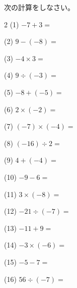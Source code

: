 \documentclass[a4paper, 11pt]{ltjsarticle}
\begin{document}
次の計算をしなさい。


\vspace*{5ex}

\begin{multicols*}{2}
\noindent (1) \quad $-7+3 =$
\vspace*{\fill}

\noindent (2) \quad $9-(-8) =$
\vspace*{\fill}

\noindent (3) \quad $-4\times3 =$
\vspace*{\fill}

\noindent (4) \quad $9\div(-3) =$
\vspace*{\fill}

\noindent (5) \quad $-8+(-5) =$
\vspace*{\fill}

\noindent (6) \quad $2\times(-2) =$
\vspace*{\fill}

\noindent (7) \quad $(-7)\times(-4) =$
\vspace*{\fill}

\noindent (8) \quad $(-16)\div2 =$
\vspace*{\fill}

\noindent (9) \quad $4+(-4) =$
\vspace*{\fill}

\noindent (10) \quad $-9-6 =$
\vspace*{\fill}
\columnbreak

\noindent (11) \quad $3\times(-8) =$
\vspace*{\fill}

\noindent (12) \quad $-21\div(-7) =$
\vspace*{\fill}

\noindent (13) \quad $-11+9 =$
\vspace*{\fill}

\noindent (14) \quad $-3\times(-6) =$
\vspace*{\fill}

\noindent (15) \quad $-5-7 =$
\vspace*{\fill}

\noindent (16) \quad $56\div(-7) =$
\vspace*{\fill}


\end{multicols*}
\end{document}
